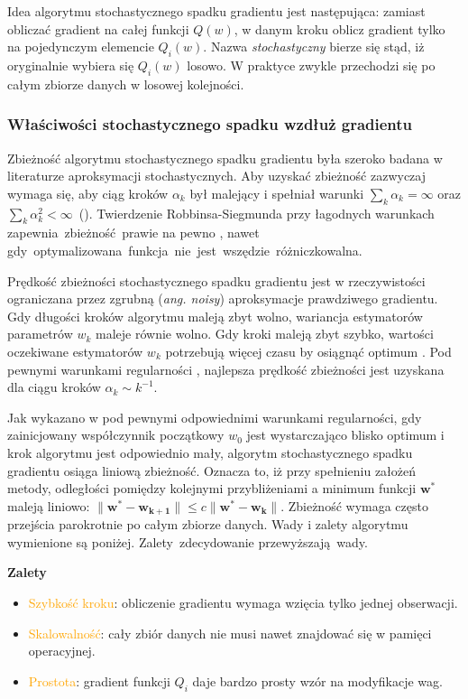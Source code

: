 Idea algorytmu stochastycznego spadku gradientu jest następująca: zamiast obliczać gradient na całej funkcji $Q(w)$, w danym kroku oblicz
gradient tylko na pojedynczym elemencie $Q_{i}(w)$. Nazwa \textit{stochastyczny} bierze się stąd, iż oryginalnie wybiera
się $Q_{i}(w)$ losowo. W praktyce zwykle przechodzi się po całym zbiorze danych w losowej kolejności.
\subsubsection{Właściwości stochastycznego spadku wzdłuż gradientu}
Zbieżność algorytmu stochastycznego spadku gradientu była szeroko badana w literaturze aproksymacji stochastycznych. Aby uzyskać zbieżność zazwyczaj wymaga się, aby ciąg kroków $\alpha_k$ był malejący i spełniał warunki $\sum\nolimits_k \alpha_k = \infty$ oraz $\sum\nolimits_k \alpha_k^2 < \infty$~(\cite{bott1}).
Twierdzenie Robbinsa-Siegmunda \citep{robbins} przy łagodnych warunkach zapewnia~zbieżność~prawie na pewno \citep{bottDOD}, nawet  gdy~optymalizowana~funkcja~nie~jest~wszędzie~różniczkowalna.

Prędkość zbieżności stochastycznego spadku gradientu jest w rzeczywistości ograniczana przez zgrubną (\textit{ang. noisy}) aproksymacje prawdziwego gradientu. Gdy długości kroków algorytmu
maleją zbyt wolno, wariancja estymatorów parametrów $w_k$ maleje równie wolno. Gdy kroki maleją
zbyt szybko, wartości oczekiwane estymatorów $w_k$ potrzebują więcej czasu by osiągnąć optimum \citep{bott1}. Pod pewnymi warunkami regularności \citep{murata}, najlepsza prędkość zbieżności jest uzyskana dla ciągu kroków $\alpha_k\sim k^{-1}$.

Jak wykazano w \cite{dennis} pod pewnymi odpowiednimi warunkami regularności, gdy zainicjowany współczynnik początkowy $w_0$ jest wystarczająco blisko optimum i krok algorytmu jest odpowiednio mały, algorytm stochastycznego spadku gradientu osiąga liniową zbieżność. Oznacza to, iż przy spełnieniu założeń metody, odległości pomiędzy kolejnymi przybliżeniami a minimum funkcji $\mathbf{w^{\ast}}$ maleją liniowo: $\parallel \mathbf{w^{\ast}} - \mathbf{w_{k+1}} \parallel \leqslant c \parallel \mathbf{w^{\ast}} - \mathbf{w_k} \parallel$. Zbieżność wymaga często przejścia parokrotnie po całym
zbiorze danych. Wady i zalety algorytmu wymienione są poniżej. Zalety~zdecydowanie przewyższają~wady.

\textbf{Zalety} \vspace{-5pt}
\begin{itemize}
\item \textcolor{orange}{Szybkość kroku}: obliczenie gradientu wymaga wzięcia tylko jednej
obserwacji.
\item \textcolor{orange}{Skalowalność}: cały zbiór danych nie musi nawet znajdować się
w pamięci operacyjnej.
\item \textcolor{orange}{Prostota}: gradient funkcji  $Q_{i}$ daje bardzo prosty wzór na
modyfikacje wag.
\end{itemize}

